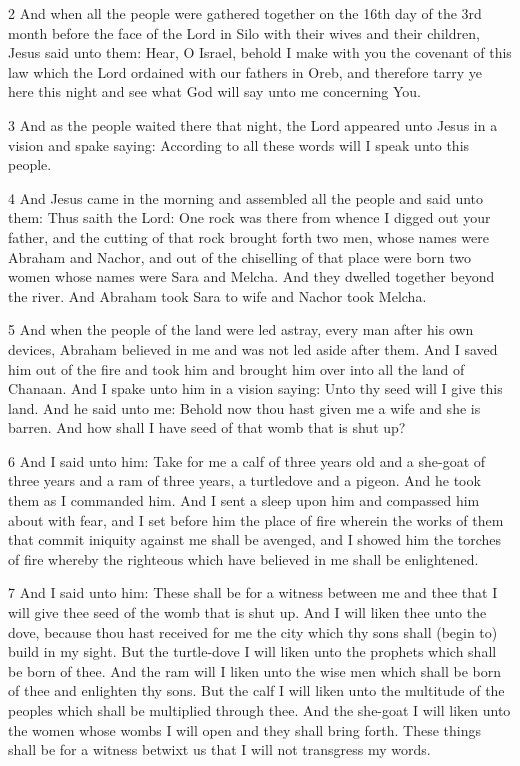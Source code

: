 \par 2 And when all the people were gathered together on the 16th day of the 3rd month before the face of the Lord in Silo with their wives and their children, Jesus said unto them: Hear, O Israel, behold I make with you the covenant of this law which the Lord ordained with our fathers in Oreb, and therefore tarry ye here this night and see what God will say unto me concerning You. 

\par 3 And as the people waited there that night, the Lord appeared unto Jesus in a vision and spake saying: According to all these words will I speak unto this people. 

\par 4 And Jesus came in the morning and assembled all the people and said unto them: Thus saith the Lord: One rock was there from whence I digged out your father, and the cutting of that rock brought forth two men, whose names were Abraham and Nachor, and out of the chiselling of that place were born two women whose names were Sara and Melcha. And they dwelled together beyond the river. And Abraham took Sara to wife and Nachor took Melcha. 

\par 5 And when the people of the land were led astray, every man after his own devices, Abraham believed in me and was not led aside after them. And I saved him out of the fire and took him and brought him over into all the land of Chanaan. And I spake unto him in a vision saying: Unto thy seed will I give this land. And he said unto me: Behold now thou hast given me a wife and she is barren. And how shall I have seed of that womb that is shut up? 

\par 6 And I said unto him: Take for me a calf of three years old and a she-goat of three years and a ram of three years, a turtledove and a pigeon. And he took them as I commanded him. And I sent a sleep upon him and compassed him about with fear, and I set before him the place of fire wherein the works of them that commit iniquity against me shall be avenged, and I showed him the torches of fire whereby the righteous which have believed in me shall be enlightened. 

\par 7 And I said unto him: These shall be for a witness between me and thee that I will give thee seed of the womb that is shut up. And I will liken thee unto the dove, because thou hast received for me the city which thy sons shall (begin to) build in my sight. But the turtle-dove I will liken unto the prophets which shall be born of thee. And the ram will I liken unto the wise men which shall be born of thee and enlighten thy sons. But the calf I will liken unto the multitude of the peoples which shall be multiplied through thee. And the she-goat I will liken unto the women whose wombs I will open and they shall bring forth. These things shall be for a witness betwixt us that I will not transgress my words.

